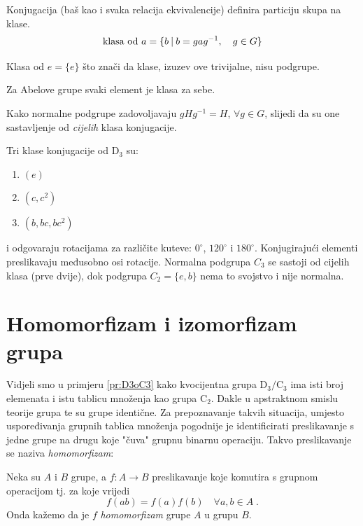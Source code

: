 Konjugacija (baš kao i svaka relacija ekvivalencije) definira
particiju skupa na klase.
\begin{displaymath}
   \text{klasa od $a$} = \{ b \: | \: b=gag^{-1},\quad g\in G\}
\end{displaymath}

Klasa od $e=\{e\}$ što znači da klase, izuzev ove trivijalne, nisu podgrupe.

Za Abelove grupe svaki element je klasa za sebe.

Kako normalne podgrupe zadovoljavaju $gHg^{-1}=H$, $\forall g\in G$, slijedi
da su one sastavljenje od \emph{cijelih} klasa konjugacije.

\begin{primjer}[D$_3$]
Tri klase konjugacije  od D$_3$ su:
\begin{enumerate}
\item $(e)$
\item $(c, c^{2})$
\item $(b, bc, bc^2)$
\end{enumerate}
i odgovaraju rotacijama za različite kuteve: $0^\circ$, $120^\circ$ i
$180^\circ$. Konjugirajući elementi
preslikavaju međusobno osi rotacije. Normalna podgrupa $C_3$ se
sastoji od cijelih klasa (prve dvije), dok podgrupa $C_2=\{e,b\}$ nema
to svojstvo i nije normalna.
\end{primjer}


\section{Homomorfizam i izomorfizam grupa}

Vidjeli smo u primjeru \ref{pr:D3oC3} kako kvocijentna grupa $\mathrm{D}_3/\mathrm{C}_3$
ima isti broj elemenata i istu tablicu množenja kao grupa $\mathrm{C}_2$. Dakle u
apstraktnom smislu teorije grupa te su grupe identične.  Za prepoznavanje takvih
situacija, umjesto uspoređivanja grupnih tablica množenja pogodnije je identificirati
preslikavanje s jedne grupe na drugu koje "čuva" grupnu binarnu operaciju. Takvo preslikavanje
se naziva \emph{homomorfizam}:
\begin{definicija}[Homomorfizam]
Neka su $A$ i $B$ grupe, a $f:A\to B$ preslikavanje koje komutira
s grupnom operacijom tj. za koje vrijedi
\begin{displaymath}
      f(ab)=f(a)f(b) \quad \forall a,b\in A \;.
\end{displaymath}
Onda kažemo da je $f$ \emph{homomorfizam} grupe $A$ u grupu $B$.
\end{definicija}

